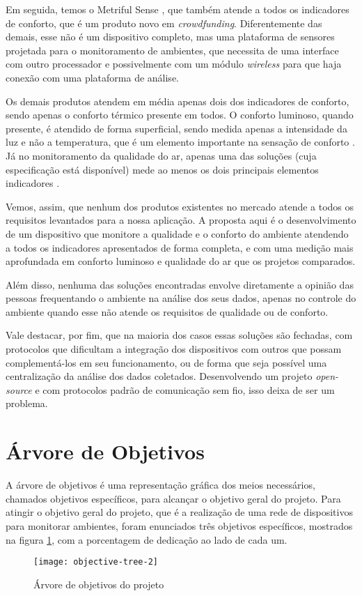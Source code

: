 \documentclass[../monografia.tex]{subfiles}
\begin{document}
Em seguida, temos o Metriful Sense \cite{metriful}, que também atende a todos os indicadores de conforto, que é um produto novo em \textit{crowdfunding}. Diferentemente das demais, esse não é um dispositivo completo, mas uma plataforma de sensores projetada para o monitoramento de ambientes, que necessita de uma interface com outro processador e possivelmente com um módulo \textit{wireless} para que haja conexão com uma plataforma de análise. 

Os demais produtos atendem em média apenas dois dos indicadores de conforto, sendo apenas o conforto térmico presente em todos. O conforto luminoso, quando presente, é atendido de forma superficial, sendo medida apenas a intensidade da luz e não a temperatura, que é um elemento importante na sensação de conforto \cite{VisualComfort}. Já no monitoramento da qualidade do ar, apenas uma das soluções \cite{ECOMLITE} (cuja especificação está disponível) mede ao menos os dois principais elementos indicadores \cite{AirQuality}. 

Vemos, assim, que nenhum dos produtos existentes no mercado atende a todos os requisitos levantados para a nossa aplicação. A proposta aqui é o desenvolvimento de um dispositivo que monitore a qualidade e o conforto do ambiente atendendo a todos os indicadores apresentados de forma completa, e com uma medição mais aprofundada em conforto luminoso e qualidade do ar que os projetos comparados. 

Além disso, nenhuma das soluções encontradas envolve diretamente a opinião das pessoas frequentando o ambiente na análise dos seus dados, apenas no controle do ambiente quando esse não atende os requisitos de qualidade ou de conforto. 

Vale destacar, por fim, que na maioria dos casos essas soluções são fechadas, com protocolos que dificultam a integração dos dispositivos com outros que possam complementá-los em seu funcionamento, ou de forma que seja possível uma centralização da análise dos dados coletados. Desenvolvendo um projeto \textit{open-source} e com protocolos padrão de comunicação sem fio, isso deixa de ser um problema. 

\section{Árvore de Objetivos} 
A árvore de objetivos é uma representação gráfica dos meios necessários, chamados objetivos específicos, para alcançar o objetivo geral do projeto. Para atingir o objetivo geral do projeto, que é a realização de uma rede de dispositivos para monitorar ambientes, foram enunciados três objetivos específicos, mostrados na figura \ref{fig:objective-tree}, com a porcentagem de dedicação ao lado de cada um.

\begin{figure}[h!]
\texttt{[image: objective-tree-2]}
\caption{Árvore de objetivos do projeto}
\label{fig:objective-tree}
\end{figure}
\end{document}
